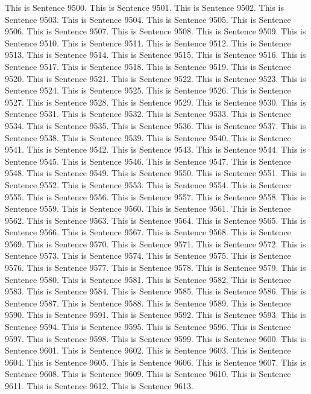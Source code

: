 \documentclass{article}
\begin{document}
This is Sentence 9500.
This is Sentence 9501.
This is Sentence 9502.
This is Sentence 9503.
This is Sentence 9504.
This is Sentence 9505.
This is Sentence 9506.
This is Sentence 9507.
This is Sentence 9508.
This is Sentence 9509.
This is Sentence 9510.
This is Sentence 9511.
This is Sentence 9512.
This is Sentence 9513.
This is Sentence 9514.
This is Sentence 9515.
This is Sentence 9516.
This is Sentence 9517.
This is Sentence 9518.
This is Sentence 9519.
This is Sentence 9520.
This is Sentence 9521.
This is Sentence 9522.
This is Sentence 9523.
This is Sentence 9524.
This is Sentence 9525.
This is Sentence 9526.
This is Sentence 9527.
This is Sentence 9528.
This is Sentence 9529.
This is Sentence 9530.
This is Sentence 9531.
This is Sentence 9532.
This is Sentence 9533.
This is Sentence 9534.
This is Sentence 9535.
This is Sentence 9536.
This is Sentence 9537.
This is Sentence 9538.
This is Sentence 9539.
This is Sentence 9540.
This is Sentence 9541.
This is Sentence 9542.
This is Sentence 9543.
This is Sentence 9544.
This is Sentence 9545.
This is Sentence 9546.
This is Sentence 9547.
This is Sentence 9548.
This is Sentence 9549.
This is Sentence 9550.
This is Sentence 9551.
This is Sentence 9552.
This is Sentence 9553.
This is Sentence 9554.
This is Sentence 9555.
This is Sentence 9556.
This is Sentence 9557.
This is Sentence 9558.
This is Sentence 9559.
This is Sentence 9560.
This is Sentence 9561.
This is Sentence 9562.
This is Sentence 9563.
This is Sentence 9564.
This is Sentence 9565.
This is Sentence 9566.
This is Sentence 9567.
This is Sentence 9568.
This is Sentence 9569.
This is Sentence 9570.
This is Sentence 9571.
This is Sentence 9572.
This is Sentence 9573.
This is Sentence 9574.
This is Sentence 9575.
This is Sentence 9576.
This is Sentence 9577.
This is Sentence 9578.
This is Sentence 9579.
This is Sentence 9580.
This is Sentence 9581.
This is Sentence 9582.
This is Sentence 9583.
This is Sentence 9584.
This is Sentence 9585.
This is Sentence 9586.
This is Sentence 9587.
This is Sentence 9588.
This is Sentence 9589.
This is Sentence 9590.
This is Sentence 9591.
This is Sentence 9592.
This is Sentence 9593.
This is Sentence 9594.
This is Sentence 9595.
This is Sentence 9596.
This is Sentence 9597.
This is Sentence 9598.
This is Sentence 9599.
This is Sentence 9600.
This is Sentence 9601.
This is Sentence 9602.
This is Sentence 9603.
This is Sentence 9604.
This is Sentence 9605.
This is Sentence 9606.
This is Sentence 9607.
This is Sentence 9608.
This is Sentence 9609.
This is Sentence 9610.
This is Sentence 9611.
This is Sentence 9612.
This is Sentence 9613.
\end{document}
